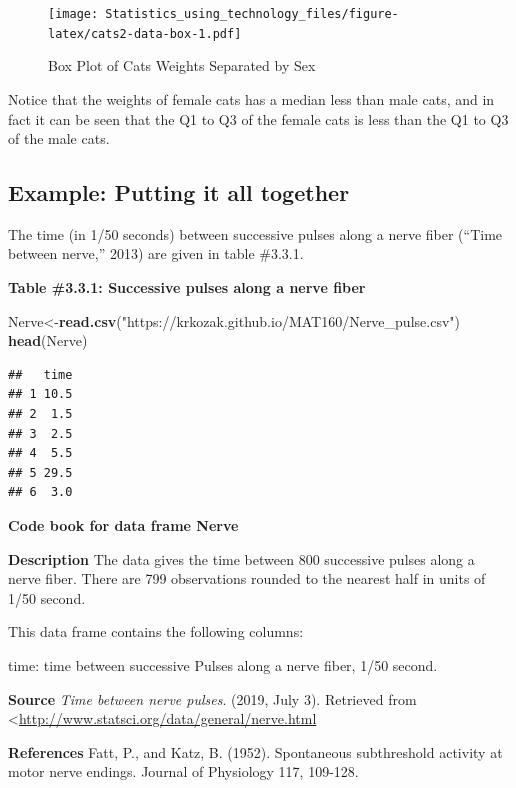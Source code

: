 \documentclass[
]{book}
\newenvironment{Shaded}{\begin{snugshade}}{\end{snugshade}}
\newcommand{\KeywordTok}[1]{\textcolor[rgb]{0.13,0.29,0.53}{\textbf{#1}}}
\newcommand{\NormalTok}[1]{#1}
\newcommand{\StringTok}[1]{\textcolor[rgb]{0.31,0.60,0.02}{#1}}
\begin{document}
\begin{figure}
\centering
\texttt{[image: Statistics\_using\_technology\_files/figure-latex/cats2-data-box-1.pdf]}
\caption{\label{fig:cats2-data-box}Box Plot of Cats Weights Separated by Sex}
\end{figure}

Notice that the weights of female cats has a median less than male cats, and in fact it can be seen that the Q1 to Q3 of the female cats is less than the Q1 to Q3 of the male cats.

\hypertarget{example-putting-it-all-together}{%
\subsection{Example: Putting it all together}\label{example-putting-it-all-together}}

The time (in 1/50 seconds) between successive pulses along a nerve fiber (``Time between nerve,'' 2013) are given in table \#3.3.1.

\textbf{Table \#3.3.1: Successive pulses along a nerve fiber}

\begin{Shaded}
\begin{Highlighting}[]
\NormalTok{Nerve<-}\KeywordTok{read.csv}\NormalTok{(}\StringTok{"https://krkozak.github.io/MAT160/Nerve_pulse.csv"}\NormalTok{)}
\KeywordTok{head}\NormalTok{(Nerve)}
\end{Highlighting}
\end{Shaded}

\begin{verbatim}
##   time
## 1 10.5
## 2  1.5
## 3  2.5
## 4  5.5
## 5 29.5
## 6  3.0
\end{verbatim}

\textbf{Code book for data frame Nerve}

\textbf{Description}
The data gives the time between 800 successive pulses along a nerve fiber. There are 799 observations rounded to the nearest half in units of 1/50 second.

This data frame contains the following columns:

time: time between successive Pulses along a nerve fiber, 1/50 second.

\textbf{Source}
\emph{Time between nerve pulses}. (2019, July 3). Retrieved from
\textless{}\url{http://www.statsci.org/data/general/nerve.html}

\textbf{References}
Fatt, P., and Katz, B. (1952). Spontaneous subthreshold activity at motor nerve endings. Journal of Physiology 117, 109-128.
\end{document}
